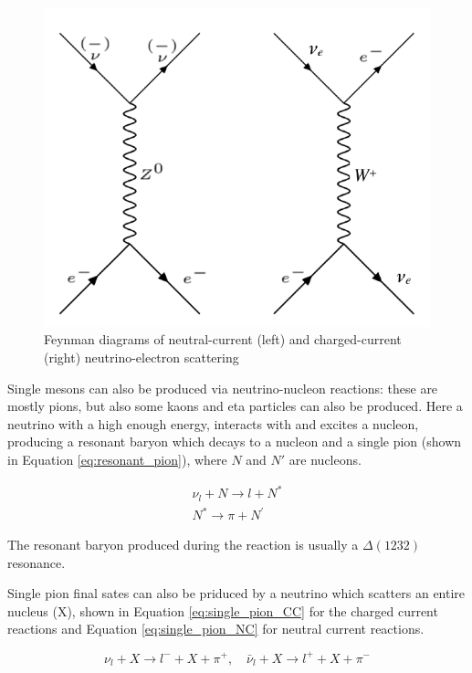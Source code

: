 \begin{figure}
    \includegraphics[width=\textwidth]{Figures/elastic_scattering.png}
    \caption{Feynman diagrams of neutral-current (left) and charged-current (right) neutrino-electron scattering}
    \label{fig:elastic_scattering}
\end{figure}

Single mesons can also be produced via neutrino-nucleon reactions: these are mostly pions, but also some kaons and eta particles can also be produced. Here a neutrino with a high enough energy, interacts with and excites a nucleon, producing a resonant baryon which decays to a nucleon and a single pion (shown in Equation \ref{eq:resonant_pion}), where $N$ and $N'$ are nucleons.

$$
\begin{gathered}
\nu_{l}+N \rightarrow l+N^{*} \\
N^{*} \rightarrow \pi+N^{\prime}
\end{gathered}
\label{eq:resonant_pion}
$$

The resonant baryon produced during the reaction is usually a $\Delta(1232)$ resonance. 

Single pion final sates can also be priduced by a neutrino which scatters an entire nucleus (X), shown in Equation \ref{eq:single_pion_CC} for the charged current reactions and Equation \ref{eq:single_pion_NC} for neutral current reactions. 

\begin{equation}
\nu_{l}+X \rightarrow l^{-}+X+\pi^{+}, \quad \bar{\nu}_{l}+X \rightarrow l^{+}+X+\pi^{-}
\label{eq:single_pion_CC}
\end{equation}

